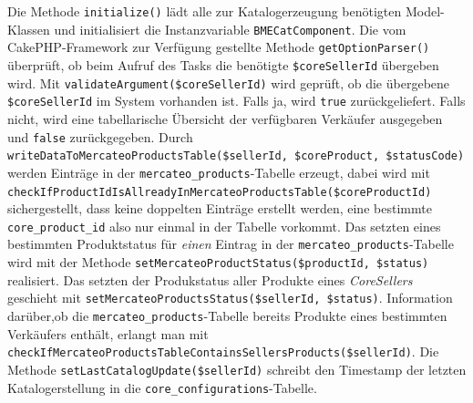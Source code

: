 	Die Methode \texttt{initialize()} lädt alle zur Katalogerzeugung benötigten Model-Klassen und initialisiert die Instanzvariable \texttt{BMECatComponent}.
	Die vom CakePHP-Framework zur Verfügung gestellte Methode \texttt{getOptionParser()} überprüft, ob beim Aufruf des Tasks die benötigte \texttt{\$coreSellerId} übergeben wird.
	Mit \texttt{validateArgument(\$coreSellerId)} wird geprüft, ob die übergebene \texttt{\$coreSellerId} im System vorhanden ist. Falls ja, wird \texttt{true} zurückgeliefert. Falls nicht, wird eine tabellarische Übersicht der verfügbaren Verkäufer ausgegeben und \texttt{false} zurückgegeben.
	Durch \texttt{writeDataToMercateoProductsTable(\$sellerId, \$coreProduct, \$statusCode)} werden Einträge in der \texttt{mercateo\_products}-Tabelle erzeugt, dabei wird mit \texttt{checkIfProductIdIsAllreadyInMercateoProductsTable(\$coreProductId)} sichergestellt, dass keine doppelten Einträge erstellt werden, eine bestimmte \texttt{core\_product\_id} also nur einmal in der Tabelle vorkommt. Das setzten eines bestimmten Produktstatus für \textit{einen} Eintrag in der \texttt{mercateo\_products}-Tabelle wird mit der Methode \texttt{setMercateoProductStatus(\$productId, \$status)} realisiert. Das setzten der Produkstatus aller Produkte eines \textit{CoreSellers} geschieht mit \texttt{setMercateoProductsStatus(\$sellerId, \$status)}.
	Information darüber,ob die \texttt{mercateo\_products}-Tabelle bereits Produkte eines bestimmten Verkäufers enthält, erlangt man mit \texttt{checkIfMercateoProductsTableContainsSellersProducts(\$sellerId)}. Die Methode \texttt{setLastCatalogUpdate(\$sellerId)} schreibt den Timestamp der letzten Katalogerstellung in die \texttt{core\_configurations}-Tabelle.\\
	

